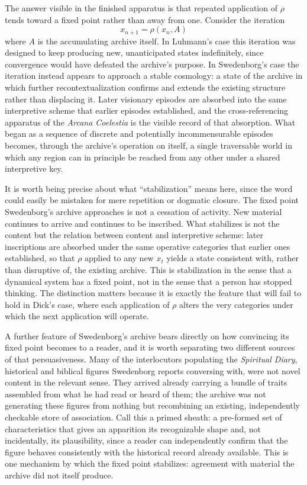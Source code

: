 \documentclass[11pt]{article}
\begin{document}
The answer visible in the finished apparatus is that repeated application of $\rho$ tends toward a fixed point rather than away from one. Consider the iteration
\[
x_{n+1} = \rho(x_n, A)
\]
where $A$ is the accumulating archive itself. In Luhmann's case this iteration was designed to keep producing new, unanticipated states indefinitely, since convergence would have defeated the archive's purpose. In Swedenborg's case the iteration instead appears to approach a stable cosmology: a state of the archive in which further recontextualization confirms and extends the existing structure rather than displacing it. Later visionary episodes are absorbed into the same interpretive scheme that earlier episodes established, and the cross-referencing apparatus of the \emph{Arcana Coelestia} is the visible record of that absorption. What began as a sequence of discrete and potentially incommensurable episodes becomes, through the archive's operation on itself, a single traversable world in which any region can in principle be reached from any other under a shared interpretive key.

It is worth being precise about what ``stabilization'' means here, since the word could easily be mistaken for mere repetition or dogmatic closure. The fixed point Swedenborg's archive approaches is not a cessation of activity. New material continues to arrive and continues to be inscribed. What stabilizes is not the content but the relation between content and interpretive scheme: later inscriptions are absorbed under the same operative categories that earlier ones established, so that $\rho$ applied to any new $x_t$ yields a state consistent with, rather than disruptive of, the existing archive. This is stabilization in the sense that a dynamical system has a fixed point, not in the sense that a person has stopped thinking. The distinction matters because it is exactly the feature that will fail to hold in Dick's case, where each application of $\rho$ alters the very categories under which the next application will operate.

A further feature of Swedenborg's archive bears directly on how convincing its fixed point becomes to a reader, and it is worth separating two different sources of that persuasiveness. Many of the interlocutors populating the \emph{Spiritual Diary}, historical and biblical figures Swedenborg reports conversing with, were not novel content in the relevant sense. They arrived already carrying a bundle of traits assembled from what he had read or heard of them; the archive was not generating these figures from nothing but recombining an existing, independently checkable store of association. Call this a primed sheath: a pre-formed set of characteristics that gives an apparition its recognizable shape and, not incidentally, its plausibility, since a reader can independently confirm that the figure behaves consistently with the historical record already available. This is one mechanism by which the fixed point stabilizes: agreement with material the archive did not itself produce.
\end{document}
